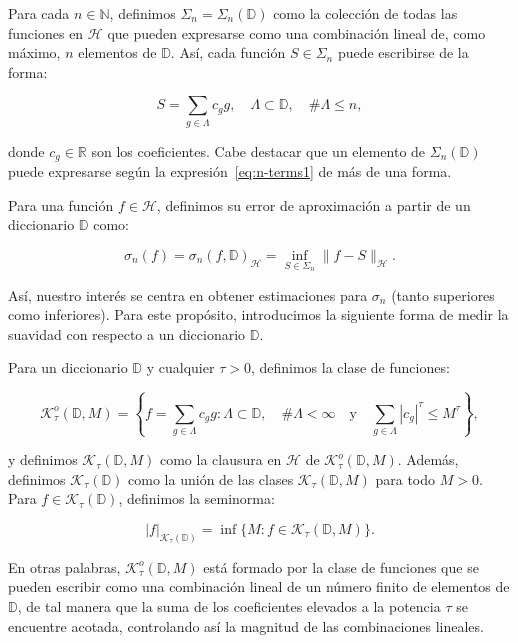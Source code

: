 Para cada $n \in \mathbb{N}$, definimos $\Sigma_n = \Sigma_n(\mathbb{D})$ como la colección de todas las funciones en $\mathcal{H}$ que pueden expresarse como una combinación lineal de, como máximo, $n$ elementos de $\mathbb{D}$. Así, cada función $S \in \Sigma_n$ puede escribirse de la forma:

\begin{equation}\label{eq:n-terms1}
    S = \sum_{g \in \Lambda} c_g g, \quad \Lambda \subset \mathbb{D}, \quad \#\Lambda \leq n,
\end{equation}

donde $c_g \in \mathbb{R}$ son los coeficientes. Cabe destacar que un elemento de $\Sigma_n(\mathbb{D})$ puede expresarse según la expresión~\eqref{eq:n-terms1} de más de una forma.

\begin{definicion}
    Para una función $f \in \mathcal{H}$, definimos su error de aproximación a partir de un diccionario $\mathbb{D}$ como:

    \[
        \sigma_n(f) = \sigma_n(f, \mathbb{D})_{\mathcal{H}} = \inf_{S \in \Sigma_n} \| f - S \|_{\mathcal{H}}.
    \]
\end{definicion}

Así, nuestro interés se centra en obtener estimaciones para $\sigma_n$ (tanto superiores como inferiores). Para este propósito, introducimos la siguiente forma de medir la suavidad con respecto a un diccionario $\mathbb{D}$.

\begin{definicion}
    Para un diccionario $\mathbb{D}$ y cualquier $\tau > 0$, definimos la clase de funciones:

    \[
        \mathcal{K}_{\tau}^{o}(\mathbb{D}, M) = \left\{ f = \sum_{g \in \Lambda} c_g g : \Lambda \subset \mathbb{D}, \quad \#\Lambda < \infty \quad \text{y} \quad \sum_{g \in \Lambda} |c_g|^{\tau} \leq M^{\tau} \right\},
    \]

    y definimos $\mathcal{K}_{\tau}(\mathbb{D}, M)$ como la clausura en $\mathcal{H}$ de $\mathcal{K}_{\tau}^{o}(\mathbb{D}, M)$. Además, definimos $\mathcal{K}_{\tau}(\mathbb{D})$ como la unión de las clases $\mathcal{K}_{\tau}(\mathbb{D}, M)$ para todo $M > 0$. Para $f \in \mathcal{K}_{\tau}(\mathbb{D})$, definimos la seminorma:

    \[
        |f|_{\mathcal{K}_{\tau}(\mathbb{D})} = \inf\{ M : f \in \mathcal{K}_{\tau}(\mathbb{D}, M) \}.
    \]
\end{definicion}

En otras palabras, $\mathcal{K}_{\tau}^{o}(\mathbb{D}, M)$ está formado por la clase de funciones que se pueden escribir como una combinación lineal de un número finito de elementos de $\mathbb{D}$, de tal manera que la suma de los coeficientes elevados a la potencia $\tau$ se encuentre acotada, controlando así la magnitud de las combinaciones lineales.

